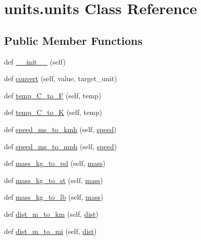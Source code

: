 \hypertarget{classunits_1_1units}{}\section{units.\+units Class Reference}
\label{classunits_1_1units}
\subsection*{Public Member Functions}
\begin{DoxyCompactItemize}
\item 
def \hyperlink{classunits_1_1units_a5127edbff09fdefbbd817b8fe069e3c9}{\+\_\+\+\_\+init\+\_\+\+\_\+} (self)
\item 
def \hyperlink{classunits_1_1units_a9c3f8fdf21305ae05a38649233549925}{convert} (self, value, target\+\_\+unit)
\item 
def \hyperlink{classunits_1_1units_a59cb803b7f3f34fec224e047ded48cdb}{temp\+\_\+\+C\+\_\+to\+\_\+F} (self, temp)
\item 
def \hyperlink{classunits_1_1units_aacbd2271524a124c433305cab790b496}{temp\+\_\+\+C\+\_\+to\+\_\+K} (self, temp)
\item 
def \hyperlink{classunits_1_1units_a36d19243c733324f4d3779ab047f6775}{speed\+\_\+ms\+\_\+to\+\_\+kmh} (self, \hyperlink{namespaceunits_a759e0d0478b90aaac881c06441083170}{speed})
\item 
def \hyperlink{classunits_1_1units_a9ca0a3b531dd6d580a5f50d47250a889}{speed\+\_\+ms\+\_\+to\+\_\+mph} (self, \hyperlink{namespaceunits_a759e0d0478b90aaac881c06441083170}{speed})
\item 
def \hyperlink{classunits_1_1units_a0c0d36f959513967d3e67d91741f382e}{mass\+\_\+kg\+\_\+to\+\_\+pd} (self, \hyperlink{namespaceunits_a56758bcc2c4dd39571c297387d4a5a20}{mass})
\item 
def \hyperlink{classunits_1_1units_acb3efb0b7dc98e5f816417cd520817fd}{mass\+\_\+kg\+\_\+to\+\_\+st} (self, \hyperlink{namespaceunits_a56758bcc2c4dd39571c297387d4a5a20}{mass})
\item 
def \hyperlink{classunits_1_1units_a175b076c9d2796e620b66646b1a85eac}{mass\+\_\+kg\+\_\+to\+\_\+lb} (self, \hyperlink{namespaceunits_a56758bcc2c4dd39571c297387d4a5a20}{mass})
\item 
def \hyperlink{classunits_1_1units_a530de99e13adbee5b18256aa060cf032}{dist\+\_\+m\+\_\+to\+\_\+km} (self, \hyperlink{namespaceunits_ab66c7acd86085e0dd596e5835d5f020a}{dist})
\item 
def \hyperlink{classunits_1_1units_aa70deff236b3144c9346462e7db4c435}{dist\+\_\+m\+\_\+to\+\_\+mi} (self, \hyperlink{namespaceunits_ab66c7acd86085e0dd596e5835d5f020a}{dist})

\end{DoxyCompactItemize}
